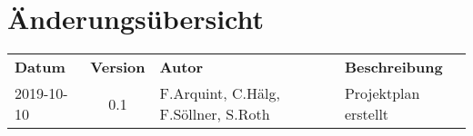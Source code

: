 \section*{Änderungsübersicht}
\begin{tabular}{lcll}
    \textbf{Datum} & \textbf{Version} & \textbf{Autor} & \textbf{Beschreibung}\\
    2019-10-10 & 0.1 & F.Arquint, C.Hälg, F.Söllner, S.Roth& Projektplan erstellt \\
\end{tabular}

